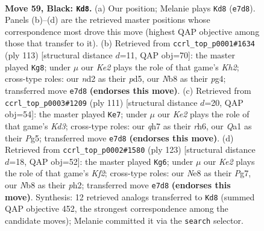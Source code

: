 \documentclass[11pt]{article}
\begin{document}
\clearpage

\begin{figure}[p]\centering
\begin{subfigure}{0.46\textwidth}\centering
\resizebox{\linewidth}{!}{%
\newchessgame
\chessboard[
  setfen={1n2n3/4k2Q/8/8/P7/7K/3N4/q7 b - - 2 59},
  showmover=false,
  pgfstyle=straightmove, color=movearrow, markmove={e7-d8}
]}
\caption{}
\end{subfigure}\hfill
\begin{subfigure}{0.46\textwidth}\centering
\resizebox{\linewidth}{!}{%
\newchessgame
\chessboard[
  setfen={8/4Q2k/7n/3P4/6PK/2q5/8/8 b - - 1 57},
  showmover=false,
  pgfstyle=straightmove, color=movearrow, markmove={h7-g8}
]}
\caption{}
\end{subfigure}
\\[4pt]
\begin{subfigure}{0.46\textwidth}\centering
\resizebox{\linewidth}{!}{%
\newchessgame
\chessboard[
  setfen={8/8/3k3R/4n1p1/6P1/8/5K2/8 b - - 0 56},
  showmover=false,
  pgfstyle=straightmove, color=movearrow, markmove={d6-e7}
]}
\caption{}
\end{subfigure}\hfill
\begin{subfigure}{0.46\textwidth}\centering
\resizebox{\linewidth}{!}{%
\newchessgame
\chessboard[
  setfen={8/5kp1/8/2q5/8/5Q2/7P/5K2 b - - 9 62},
  showmover=false,
  pgfstyle=straightmove, color=movearrow, markmove={f7-g6}
]}
\caption{}
\end{subfigure}
\caption{\textbf{Move 59, Black: \texttt{Kd8}.} (a) Our position; Melanie plays \texttt{Kd8} (\texttt{e7d8}). Panels (b)--(d) are the retrieved master positions whose correspondence most drove this move (highest QAP objective among those that transfer to it). (b) Retrieved from \texttt{ccrl\_top\_p0001\#1634} (ply 113) [structural distance $d$=11, QAP obj=70]: the master played \texttt{Kg8}; under $\mu$ our \emph{Ke2} plays the role of that game's \emph{Kh2}; cross-type roles: our \emph{n}d2 as their \emph{p}d5, our \emph{N}b8 as their \emph{p}g4; transferred move \texttt{e7d8} \textbf{(endorses this move)}. (c) Retrieved from \texttt{ccrl\_top\_p0003\#1209} (ply 111) [structural distance $d$=20, QAP obj=54]: the master played \texttt{Ke7}; under $\mu$ our \emph{Ke2} plays the role of that game's \emph{Kd3}; cross-type roles: our \emph{q}h7 as their \emph{r}h6, our \emph{Q}a1 as their \emph{P}g5; transferred move \texttt{e7d8} \textbf{(endorses this move)}. (d) Retrieved from \texttt{ccrl\_top\_p0002\#1580} (ply 123) [structural distance $d$=18, QAP obj=52]: the master played \texttt{Kg6}; under $\mu$ our \emph{Ke2} plays the role of that game's \emph{Kf2}; cross-type roles: our \emph{N}e8 as their \emph{P}g7, our \emph{N}b8 as their \emph{p}h2; transferred move \texttt{e7d8} \textbf{(endorses this move)}. Synthesis: 12 retrieved analogs transferred to \texttt{Kd8} (summed QAP objective 452, the strongest correspondence among the candidate moves); Melanie committed it via the \texttt{search} selector.}
\label{fig:thought-m117}
\end{figure}
\end{document}
